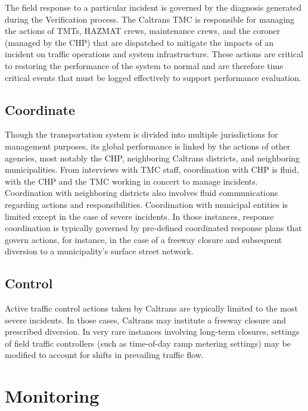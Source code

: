 \documentclass[12pt]{report}
\newcounter{time}
\begin{document}
The field response to a particular incident is governed by the diagnosis
generated during the {\sc Verification} process.  The Caltrans \ac{TMC} is
responsible for managing the actions of \acfp{TMT}, \ac{HAZMAT} crews,
maintenance crews, and the coroner (managed by the \ac{CHP}) that are dispatched
to mitigate the impacts of an incident on traffic operations and system
infrastructure.  These actions are critical to restoring the performance of the
system to normal and are therefore time critical events that must be logged
effectively to support performance evaluation.

\subsection{Coordinate}
\label{sec:coordinate}

Though the transportation system is divided into multiple jurisdictions for
management purposes, its global performance is linked by the actions of other
agencies, most notably the \ac{CHP}, neighboring Caltrans districts, and
neighboring municipalities.  From interviews with \ac{TMC} staff, coordination
with \ac{CHP} is fluid, with the \ac{CHP} and the \ac{TMC} working in concert to
manage incidents.  Coordination with neighboring districts also involves fluid
communications regarding actions and responsibilities.  Coordination with
municipal entities is limited except in the case of severe incidents.  In those
instances, response coordination is typically governed by pre-defined
coordinated response plans that govern actions, for instance, in the case of a
freeway closure and subsequent diversion to a municipality's surface street
network.


\subsection{Control}
\label{sec:control}

Active traffic control actions taken by Caltrans are typically limited to the
most severe incidents.  In those cases, Caltrans may institute a freeway closure
and prescribed diversion.  In very rare instances involving long-term closures,
settings of field traffic controllers (such as time-of-day ramp metering
settings) may be modified to account for shifts in prevailing traffic flow.


\section{Monitoring}
\label{sec:monitoring}
\end{document}
